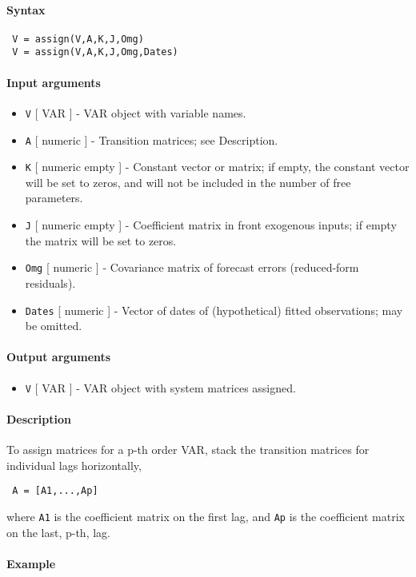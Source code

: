


	\paragraph{Syntax}
 
 \begin{verbatim}
 V = assign(V,A,K,J,Omg)
 V = assign(V,A,K,J,Omg,Dates)
 \end{verbatim}
 
 \paragraph{Input arguments}
 
 \begin{itemize}
 \item
   \texttt{V} {[} VAR {]} - VAR object with variable names.
 \item
   \texttt{A} {[} numeric {]} - Transition matrices; see Description.
 \item
   \texttt{K} {[} numeric \textbar{} empty {]} - Constant vector or
   matrix; if empty, the constant vector will be set to zeros, and will
   not be included in the number of free parameters.
 \item
   \texttt{J} {[} numeric \textbar{} empty {]} - Coefficient matrix in
   front exogenous inputs; if empty the matrix will be set to zeros.
 \item
   \texttt{Omg} {[} numeric {]} - Covariance matrix of forecast errors
   (reduced-form residuals).
 \item
   \texttt{Dates} {[} numeric {]} - Vector of dates of (hypothetical)
   fitted observations; may be omitted.
 \end{itemize}
 
 \paragraph{Output arguments}
 
 \begin{itemize}
 \item
   \texttt{V} {[} VAR {]} - VAR object with system matrices assigned.
 \end{itemize}
 
 \paragraph{Description}
 
 To assign matrices for a p-th order VAR, stack the transition matrices
 for individual lags horizontally,
 
 \begin{verbatim}
 A = [A1,...,Ap]
 \end{verbatim}
 
 where \texttt{A1} is the coefficient matrix on the first lag, and
 \texttt{Ap} is the coefficient matrix on the last, p-th, lag.
 
 \paragraph{Example}


